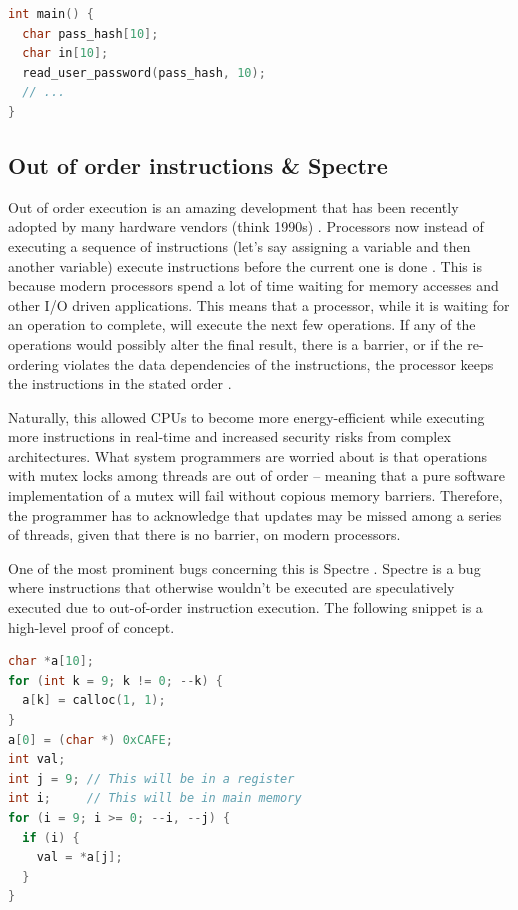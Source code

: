\begin{lstlisting}[language=C]
int main() {
  char pass_hash[10];
  char in[10];
  read_user_password(pass_hash, 10);
  // ...
}
\end{lstlisting}

\subsection{Out of order instructions \& Spectre}
\label{sec:spectre}

Out of order execution is an amazing development that has been recently adopted by many hardware vendors (think 1990s) .
Processors now instead of executing a sequence of instructions (let's say assigning a variable and then another variable) execute instructions before the current one is done \cite[P. 45]{guide2011intel}.
This is because modern processors spend a lot of time waiting for memory accesses and other I/O driven applications.
This means that a processor, while it is waiting for an operation to complete, will execute the next few operations.
If any of the operations would possibly alter the final result, there is a barrier, or if the re-ordering violates the data dependencies of the instructions, the processor keeps the instructions in the stated order \cite[P. 296]{guide2011intel}.

Naturally, this allowed CPUs to become more energy-efficient while executing more instructions in real-time and increased security risks from complex architectures.
What system programmers are worried about is that operations with mutex locks among threads are out of order -- meaning that a pure software implementation of a mutex will fail without copious memory barriers.
Therefore, the programmer has to acknowledge that updates may be missed among a series of threads, given that there is no barrier, on modern processors.

One of the most prominent bugs concerning this is Spectre \cite{kocher2018spectre}.
Spectre is a bug where instructions that otherwise wouldn't be executed are speculatively executed due to out-of-order instruction execution.
The following snippet is a high-level proof of concept.

\begin{lstlisting}[language=C]
char *a[10];
for (int k = 9; k != 0; --k) {
  a[k] = calloc(1, 1);
}
a[0] = (char *) 0xCAFE;
int val;
int j = 9; // This will be in a register
int i;     // This will be in main memory
for (i = 9; i >= 0; --i, --j) {
  if (i) {
    val = *a[j];
  }
}
\end{lstlisting}

